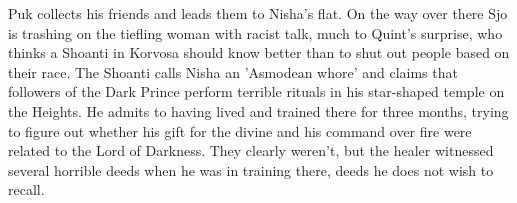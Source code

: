 Puk collects his friends and leads them to Nisha's flat. On the way over there Sjo is trashing on the tiefling woman with racist talk, much to Quint's surprise, who thinks a Shoanti in Korvosa should know better than to shut out people based on their race. The Shoanti calls Nisha an 'Asmodean whore' and claims that followers of the Dark Prince perform terrible rituals in his star-shaped temple on the Heights. He admits to having lived and trained there for three months, trying to figure out whether his gift for the divine and his command over fire were related to the Lord of Darkness. They clearly weren't, but the healer witnessed several horrible deeds when he was in training there, deeds he does not wish to recall.\\


